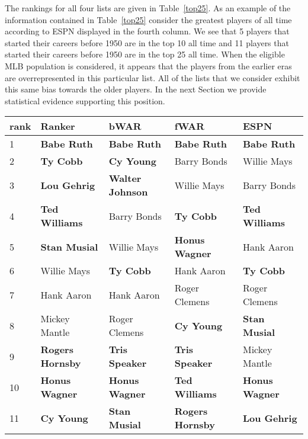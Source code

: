 \documentclass[11pt]{article}\usepackage[]{graphicx}\usepackage[]{color}
\begin{document}
The rankings for all four lists are given in Table~\ref{top25}.  
As an example of the information contained in Table~\ref{top25} consider 
the greatest players of all time according to ESPN  
displayed in the fourth column.  
We see that 5 players that started their careers before 1950 are in the top 10 
all time and 11 players that started their careers before 1950 are in the top 
25 all time.  When the eligible MLB population is considered, it appears that 
the players from the earlier eras are overrepresented in this particular list.  
All of the lists that we consider exhibit this same bias towards the older 
players.  In the next Section we provide statistical evidence supporting this 
position.  




\begin{table}[h!]
\begin{center}
\begin{tabular}{lllll}
\hline
rank & Ranker & bWAR & fWAR & ESPN \\
\hline
1  & {\bf Babe Ruth}         & {\bf Babe Ruth}      & {\bf Babe Ruth}      & {\bf Babe Ruth}      \\
2  & {\bf Ty Cobb}           & {\bf Cy Young}       & Barry Bonds          & Willie Mays          \\
3  & {\bf Lou Gehrig}        & {\bf Walter Johnson} & Willie Mays          & Barry Bonds          \\
4  & {\bf Ted Williams}      & Barry Bonds          & {\bf Ty Cobb}        & {\bf Ted Williams}   \\
5  & {\bf Stan Musial}       & Willie Mays          & {\bf Honus Wagner}   & Hank Aaron           \\
6  & Willie Mays             & {\bf Ty Cobb}        & Hank Aaron           & {\bf Ty Cobb}        \\
7  & Hank Aaron              & Hank Aaron           & Roger Clemens        & Roger Clemens        \\
8  & Mickey Mantle           & Roger Clemens        & {\bf Cy Young}       & {\bf Stan Musial}    \\
9  & {\bf Rogers Hornsby}    & {\bf Tris Speaker}   & {\bf Tris Speaker}   & Mickey Mantle        \\
10 & {\bf Honus Wagner}      & {\bf Honus Wagner}   & {\bf Ted Williams}   & {\bf Honus Wagner}   \\
11 & {\bf Cy Young}          & {\bf Stan Musial}    & {\bf Rogers Hornsby} & {\bf Lou Gehrig}     \\

\end{tabular}
\end{center}
\end{table}
\end{document}
